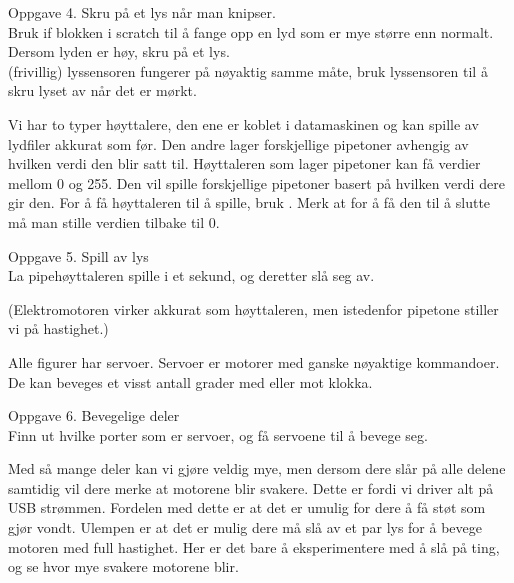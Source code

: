 \documentclass[a4paper]{article}
\newcommand{\block}[2][-0.4]{\raisebox{#1\height}{\texttt{[image: \#2]}}}
\begin{document}
\begin{large}
Oppgave 4. Skru på et lys når man knipser.\\
Bruk if blokken i scratch til å fange opp en lyd som er mye større enn normalt.
Dersom lyden er høy, skru på et lys.\\
(frivillig) lyssensoren fungerer på nøyaktig samme måte, bruk lyssensoren til å
skru lyset av når det er mørkt.

\newpage

Vi har to typer høyttalere, den ene er koblet i datamaskinen og kan spille av
lydfiler akkurat som før. 
Den andre lager forskjellige pipetoner avhengig av hvilken verdi den blir satt til.
Høyttaleren som lager pipetoner kan få verdier mellom 0 og 255. Den vil spille forskjellige
pipetoner basert på hvilken verdi dere gir den.
For å få høyttaleren til å spille, bruk \block{analog_write}. Merk at for å få den til å 
slutte må man stille verdien tilbake til 0. \block{analog_write_0}

Oppgave 5. Spill av lys\\
La pipehøyttaleren spille i et sekund, og deretter slå seg av.

(Elektromotoren virker akkurat som høyttaleren, men istedenfor pipetone stiller vi på
hastighet.)

\newpage

Alle figurer har servoer. Servoer er motorer med ganske nøyaktige kommandoer.
De kan beveges et visst antall grader med eller mot klokka. 
\block{motor_rotate}
\block{motor_angle}
\block{motor_off}

Oppgave 6. Bevegelige deler\\
Finn ut hvilke porter som er servoer, og få servoene til å bevege seg.

Med så mange deler kan vi gjøre veldig mye, men dersom dere slår på alle delene samtidig
vil dere merke at motorene blir svakere. Dette er fordi vi driver alt på USB strømmen.
Fordelen med dette er at det er umulig for dere å få støt som gjør vondt. 
Ulempen er at det er mulig dere må slå av et par lys for å bevege motoren med full hastighet.
Her er det bare å eksperimentere med å slå på ting, og se hvor mye svakere motorene blir.

\end{large}
\end{document}
